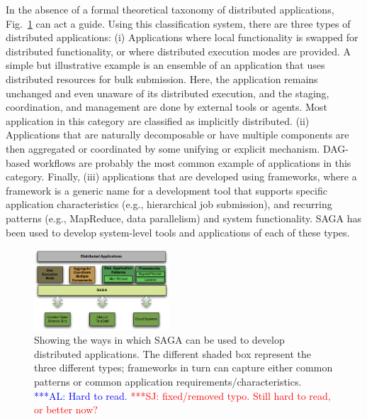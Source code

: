 \documentclass[conference,final]{IEEEtran}
\newcommand{\alnote}[1]{ {\textcolor{blue} { ***AL: #1 }}}
\newcommand{\jhanote}[1]{ {\textcolor{red} { ***SJ: #1 }}}
\newcommand{\alnote}[1]{}
\newcommand{\jhanote}[1]{}
\begin{document}
In the absence of a formal theoretical taxonomy of distributed
applications, Fig.~\ref{Fig:sagaapps} can act a guide.  Using this
classification system, there are three types of distributed
applications: (i) Applications where local functionality is swapped
for distributed functionality, or where distributed execution modes
are provided.  A simple but illustrative example is an ensemble of an
application that uses distributed resources for bulk submission. Here,
the application remains unchanged and even unaware of its distributed
execution, and the staging, coordination, and management are done by
external tools or agents. Most application in this category are
classified as implicitly distributed.  (ii) Applications that are
naturally decomposable or have multiple components are then aggregated
or coordinated by some unifying or explicit mechanism.  DAG-based
workflows are probably the most common example of applications in this
category.
Finally, (iii) applications that are developed using frameworks, where
a framework is a generic name for a development tool that supports
specific application characteristics (e.g., hierarchical job
submission), and recurring patterns (e.g., MapReduce, data
parallelism) and system functionality.  SAGA has been used to develop
system-level tools and applications of each of these types.

\begin{figure}[!ht]
  \begin{center}
    \includegraphics[width=0.45\textwidth]{distributed_applications_saga_figure.pdf}
  \end{center}
  \caption{\small Showing the ways in which
      SAGA can be used to develop distributed applications.
      The different shaded box represent the three different types;
      frameworks in turn can capture either common patterns or common
      application requirements/characteristics. \label{Fig:sagaapps}
      \alnote{Hard to read.} \jhanote{fixed/removed typo. Still hard to read, or better now?}}
\end{figure}
\end{document}
